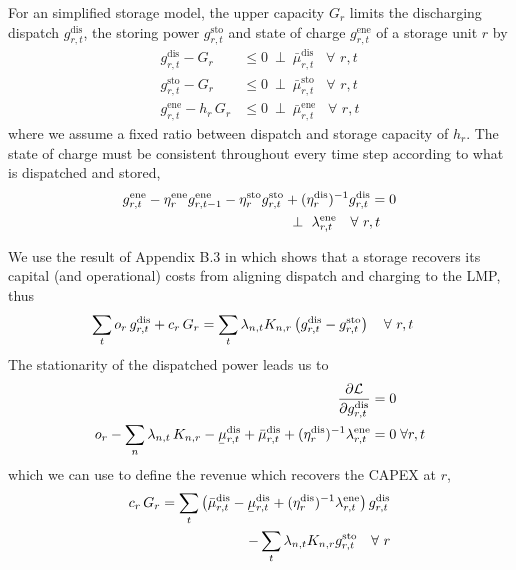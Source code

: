\documentclass[11pt,twocolumn]{article}
\newcommand{\ubar}[1]{\underaccent{\bar}{#1}}
\newcommand{\resultsin}[1]{\hspace{6pt} \bot  \hspace{6pt} #1}
\newcommand{\Forall}[1]{\hspace{10pt} \forall \,\, #1 }
\newcommand{\pdv}[2]{\frac{\partial #1}{\partial #2}}
\newcommand{\storage}{g_{r,t}}
\newcommand{\storagedispatch}{\storage^\text{dis}}
\newcommand{\storagecharge}{\storage^\text{sto}}
\newcommand{\storagesoc}{\storage^\text{ene}}
\newcommand{\storageprevioussoc}{g_{r,t-1}^\text{ene}}
\newcommand{\efficiency}{\eta_{r}}
\newcommand{\efficiencydispatch}{\efficiency^\text{dis}}
\newcommand{\efficiencycharge}{\efficiency^\text{sto}}
\newcommand{\efficiencysoc}{\efficiency^\text{ene}}
\newcommand{\operationalpricestorage}{o_r}
\newcommand{\capitalpricestorage}{c_r}
\newcommand{\capacitystorage}{G_r}
\newcommand{\mulowerstoragedispatch}{\ubar{\mu}_{r,t}^\text{dis}}
\newcommand{\muupperstoragedispatch}{\bar{\mu}_{r,t}^\text{dis}}
\newcommand{\muupperstoragecharge}{\bar{\mu}_{r,t}^\text{sto}}
\newcommand{\muupperstoragesoc}{\bar{\mu}_{r,t}^\text{ene}}
\newcommand{\mustateofcharge}{\lambda^\text{ene}_{r,t}}
\newcommand{\lagrangian}{\mathcal{L}}
\newcommand{\lmp}[1][n]{\lambda_{#1,t}}
\newcommand{\incidencestorage}[1][n]{K_{#1,r}}
\begin{document}
For an simplified storage model, the upper capacity $\capacitystorage$ limits the discharging dispatch $\storagedispatch$, the storing power $\storagecharge$ and state of charge $\storagesoc$ of a storage unit $r$ by 
\begin{align}
    \storagedispatch - \capacitystorage &\le 0  \resultsin{\muupperstoragedispatch} \Forall{r,t} \\
    \storagecharge - \capacitystorage &\le 0  \resultsin{\muupperstoragecharge} \Forall{r,t} \\
    \storagesoc - h_r \, \capacitystorage &\le 0  \resultsin{\muupperstoragesoc} \Forall{r,t}
\end{align}
where we assume a fixed ratio between dispatch and storage capacity of $h_r$. 
The state of charge must be consistent throughout every time step according to what is dispatched and stored, 
\begin{align}
    \notag
    \storagesoc - \efficiencysoc \storageprevioussoc - \efficiencycharge \storagecharge &+ (\efficiencydispatch)^{-1} \storagedispatch = 0 \\
    &\resultsin{\mustateofcharge} \Forall{r,t}
\end{align}



We use the result of Appendix B.3 in \cite{brown_decreasing_2020} which shows that a storage recovers its capital (and operational) costs from aligning dispatch and charging to the LMP, thus 
\begin{align}
    \notag
    \sum_t \operationalpricestorage \, \storagedispatch + \capitalpricestorage \, \capacitystorage = \sum_t \lmp \incidencestorage &\left(\storagedispatch - \storagecharge \right) \Forall{r,t}
\end{align}
The stationarity of the dispatched power leads us to  
\begin{align}
    \notag
    \pdv{\lagrangian}{\storagedispatch} &= 0 \\
    \operationalpricestorage - \sum_n \lmp \, \incidencestorage - \mulowerstoragedispatch + \muupperstoragedispatch + (\efficiencydispatch )^{-1} \mustateofcharge &= 0 \;  \forall r,t
    \label{eq:stationarity_storagedispatch}
\end{align}
which we  can use to define the revenue which recovers the CAPEX at $r$, 
\begin{align}
    \notag
    \capitalpricestorage \, \capacitystorage = \sum_t \left(\muupperstoragedispatch - \mulowerstoragedispatch  + (\efficiencydispatch )^{-1} \mustateofcharge \right) \storagedispatch \\
    - \sum_t \lmp \incidencestorage  \storagecharge \Forall{r} 
    \label{eq:no_profit_capex_storage2}
\end{align}
\end{document}
